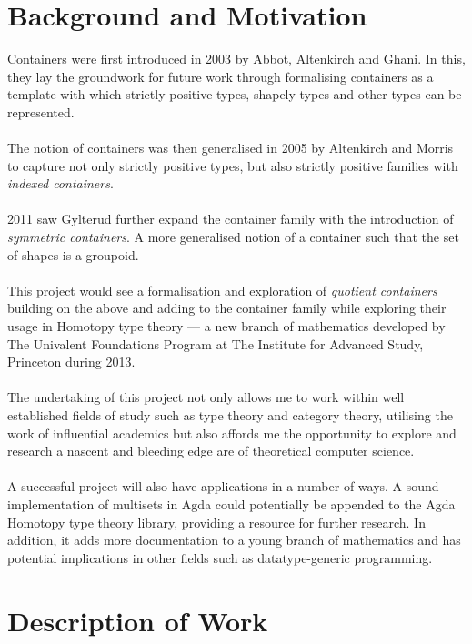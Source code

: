 \documentclass[12pt]{report}
\begin{document}
\section{Background and Motivation}
Containers were first introduced in 2003 by Abbot, Altenkirch and Ghani\cite{coc}. In this, they lay the groundwork for future work through formalising containers as a template with which strictly positive types, shapely types and other types can be represented.\\
\\
The notion of containers was then generalised in 2005 by Altenkirch and Morris\cite{icont} to capture not only strictly positive types, but also strictly positive families with \textit{indexed containers}.\\
\\
2011 saw Gylterud\cite{hott3} further expand the container family with the introduction of \textit{symmetric containers}. A more generalised notion of a container such that the set of shapes is a groupoid.\\
\\
This project would see a formalisation and exploration of \textit{quotient containers} building on the above and adding to the container family while exploring their usage in Homotopy type theory --- a new branch of mathematics developed by The Univalent Foundations Program at The Institute for Advanced Study, Princeton during 2013.\\
\\
The undertaking of this project not only allows me to work within well established fields of study such as type theory and category theory, utilising the work of influential academics but also affords me the opportunity to explore and research a nascent and bleeding edge are of theoretical computer science.\\
\\
A successful project will also have applications in a number of ways. A sound implementation of multisets in Agda could potentially be appended to the Agda Homotopy type theory library, providing a resource for further research. In addition, it adds more documentation to a young branch of mathematics and has potential implications in other fields such as datatype-generic programming.


\section{Description of Work}
\end{document}
